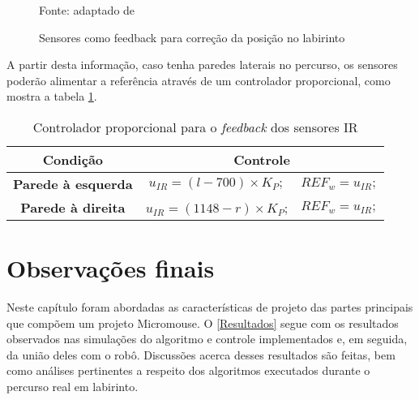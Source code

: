 \begin{figure}[!htb]
	\caption[Sensores como feedback para correção da posição]{\label{fig:feedback_IR}Sensores como feedback para correção da posição no labirinto}
	\begin{center}
		\hspace*{0.1\linewidth}
		\hspace*{0.1\linewidth}
	\end{center}
	\centering
	\small Fonte: adaptado de 
\end{figure}


A partir desta informação, caso tenha paredes laterais no percurso, os sensores poderão alimentar a referência através de um controlador proporcional, como mostra a tabela \ref{tab:controlador_IR}.


\begin{table}[!htb]
	\centering
	\caption{\label{tab:controlador_IR}Controlador proporcional para o \emph{feedback} dos sensores IR}
\begin{tabular}{c|cc}
Condição & \multicolumn{2}{c}{Controle} \\ 
\hline 
\textbf{Parede à esquerda} & $u_{IR} = (l - 700) \times K_P;$ & $REF_w = u_{IR};$ \\ 
\hline 
\textbf{Parede à direita} & $u_{IR} = (1148 - r) \times K_P$; & $REF_w = u_{IR};$ \\ 
\end{tabular} 
	
\end{table}


\section{Observações finais}
Neste capítulo foram abordadas as características de projeto das partes principais que compõem um projeto Micromouse. O \autoref{Resultados} segue com os resultados observados nas simulações do algoritmo e controle implementados e, em seguida, da união deles com o robô. Discussões acerca desses resultados são feitas, bem como análises pertinentes a respeito dos algoritmos executados durante o percurso real em labirinto.


